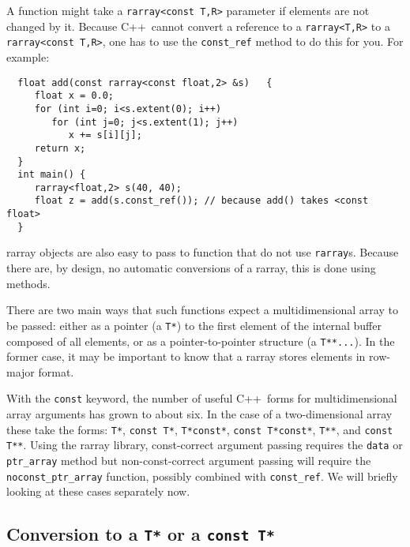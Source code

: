 \documentclass[11pt,twoside]{article}
\newcommand{\cxx}{C{++}}
\begin{document}
A function might take a \texttt{rarray{\tt<}const T,R{\tt>}} parameter if elements are not changed by it. Because \cxx\ cannot convert a reference to a \texttt{rarray{\tt<}T,R{\tt>}} to a \texttt{rarray{\tt<}const T,R{\tt>}}, one has to use the \texttt{const\_ref} method to do this for you.
For example:
\vspace{-5pt}\begin{framed}\vspace{-14pt}%
\begin{verbatim}
  float add(const rarray<const float,2> &s)   {
     float x = 0.0;
     for (int i=0; i<s.extent(0); i++)
        for (int j=0; j<s.extent(1); j++)
           x += s[i][j];
     return x;
  }
  int main() {
     rarray<float,2> s(40, 40);
     float z = add(s.const_ref()); // because add() takes <const float>
  }
\end{verbatim}%
\vspace{-14pt}
\end{framed}\vspace{-8pt}

rarray objects are also easy to pass to function that do not use \texttt{rarray}s. Because there are, by design, no automatic conversions of a
rarray, this is done using methods.

There are two main ways that such functions expect a multidimensional
array to be passed: either as a pointer (a \texttt{T*}) to the first
element of the internal buffer composed of all elements, or as a
pointer-to-pointer structure (a \texttt{T**...}).  In the former case, it may be
important to know that a rarray stores elements in row-major
format.

With the \texttt{const} keyword, the number of useful \cxx\ forms for multidimensional array arguments has grown to about six.  In the case of a two-dimensional array these take the forms:
 \texttt{T*}, \texttt{const T*}, \texttt{T*const*}, \texttt{const T*const*}, \texttt{T**}, and \texttt{const T**}.
Using the rarray library, const-correct argument passing requires the \texttt{data} or \texttt{ptr\_array} method but non-const-correct argument passing will require the \texttt{noconst\_ptr\_array} function, possibly combined with \texttt{const\_ref}.
We will briefly looking at these cases separately now.

\subsection{Conversion to a {\tt T*} or a {\tt const T*}}
\end{document}
